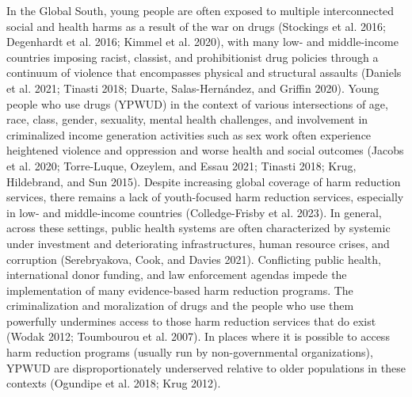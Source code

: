 \documentclass[
  letterpaper,
  DIV=11,
  numbers=noendperiod]{scrartcl}
\begin{document}
In the Global South, young people are often exposed to multiple
interconnected social and health harms as a result of the war on drugs
(Stockings et al. 2016; Degenhardt et al. 2016; Kimmel et al. 2020),
with many low- and middle-income countries imposing racist, classist,
and prohibitionist drug policies through a continuum of violence that
encompasses physical and structural assaults (Daniels et al. 2021;
Tinasti 2018; Duarte, Salas-Hernández, and Griffin 2020). Young people
who use drugs (YPWUD) in the context of various intersections of age,
race, class, gender, sexuality, mental health challenges, and
involvement in criminalized income generation activities such as sex
work often experience heightened violence and oppression and worse
health and social outcomes (Jacobs et al. 2020; Torre-Luque, Ozeylem,
and Essau 2021; Tinasti 2018; Krug, Hildebrand, and Sun 2015). Despite
increasing global coverage of harm reduction services, there remains a
lack of youth-focused harm reduction services, especially in low- and
middle-income countries (Colledge-Frisby et al. 2023). In general,
across these settings, public health systems are often characterized by
systemic under investment and deteriorating infrastructures, human
resource crises, and corruption (Serebryakova, Cook, and Davies 2021).
Conflicting public health, international donor funding, and law
enforcement agendas impede the implementation of many evidence-based
harm reduction programs. The criminalization and moralization of drugs
and the people who use them powerfully undermines access to those harm
reduction services that do exist (Wodak 2012; Toumbourou et al. 2007).
In places where it is possible to access harm reduction programs
(usually run by non-governmental organizations), YPWUD are
disproportionately underserved relative to older populations in these
contexts (Ogundipe et al. 2018; Krug 2012).
\end{document}
